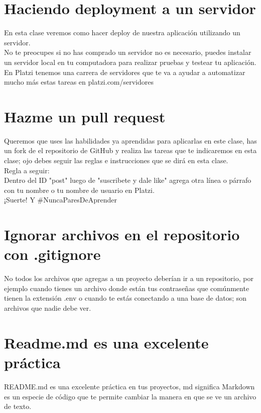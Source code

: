 \documentclass{article}
\begin{document}
\section{Haciendo deployment a un servidor}%
En esta clase veremos como hacer deploy de nuestra aplicación utilizando un
servidor.\\

No te preocupes si no has comprado un servidor no es necesario, puedes instalar
un servidor local en tu computadora para realizar pruebas y testear tu
aplicación.\\

En Platzi tenemos una carrera de servidores que te va a ayudar a automatizar
mucho más estas tareas en platzi.com/servidores\\

\section{Hazme un pull request}%
Queremos que uses las habilidades ya aprendidas para aplicarlas en este clase,
has un fork de el repositorio de GitHub y realiza las tareas que te indicaremos
en esta clase; ojo debes seguir las reglas e instrucciones que se dirá en esta
clase.\\

Regla a seguir:\\

Dentro del ID "post" luego de "suscribete y dale like" agrega otra línea o
párrafo con tu nombre o tu nombre de usuario en Platzi.\\

¡Suerte! Y \#NuncaParesDeAprender

\section{Ignorar archivos en el repositorio con .gitignore}%
No todos los archivos que agregas a un proyecto deberían ir a un repositorio,
por ejemplo cuando tienes un archivo donde están tus contraseñas que comúnmente
tienen la extensión .env o cuando te estás conectando a una base de datos; son
archivos que nadie debe ver.\\


\section{Readme.md es una excelente práctica}%
README.md es una excelente práctica en tus proyectos, md significa Markdown es
un especie de código que te permite cambiar la manera en que se ve un archivo
de texto.\\
\end{document}
